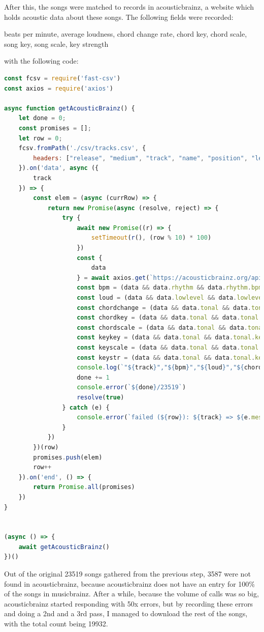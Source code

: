 \documentclass[10pt, a4paper]{article}
\begin{document}
After this, the songs were matched to records in acousticbrainz, a website which holds acoustic data about these songs. The following fields were recorded:

beats per minute, average loudness, chord change rate, chord key, chord scale, song key, song scale, key strength

with the following code:

\begin{lstlisting}[language=JavaScript, label=lst:acousticbrainzMatch, caption = Matching individual tracks in musicbrainz with entries in acousticbrainz ]
const fcsv = require('fast-csv')
const axios = require('axios')

async function getAcousticBrainz() {
	let done = 0;
	const promises = [];
	let row = 0;
	fcsv.fromPath('./csv/tracks.csv', {
		headers: ["release", "medium", "track", "name", "position", "length"]
	}).on('data', async ({
		track
	}) => {
		const elem = (async (currRow) => {
			return new Promise(async (resolve, reject) => {
				try {
					await new Promise((r) => {
						setTimeout(r(), (row % 10) * 100)
					})
					const {
						data
					} = await axios.get(`https://acousticbrainz.org/api/v1/${track}/low-level`)
					const bpm = (data && data.rhythm && data.rhythm.bpm) || "0"
					const loud = (data && data.lowlevel && data.lowlevel.average_loudness) || "0"
					const chordchange = (data && data.tonal && data.tonal.chords_changes_rate) || "0"
					const chordkey = (data && data.tonal && data.tonal.chords_key) || ""
					const chordscale = (data && data.tonal && data.tonal.chords_scale) || ""
					const keykey = (data && data.tonal && data.tonal.key_key) || ""
					const keyscale = (data && data.tonal && data.tonal.key_scale) || ""
					const keystr = (data && data.tonal && data.tonal.key_strength) || "0"
					console.log(`"${track}","${bpm}","${loud}","${chordkey} ${chordscale}","${chordchange}","${keykey} ${keyscale}","${keystr}"`)
					done += 1
					console.error(`${done}/23519`)
					resolve(true)
				} catch (e) {
					console.error(`failed (${row}): ${track} => ${e.message}`)
				}
			})
		})(row)
		promises.push(elem)
		row++
	}).on('end', () => {
		return Promise.all(promises)
	})
}


(async () => {
	await getAcousticBrainz()
})()
\end{lstlisting}

Out of the original 23519 songs gathered from the previous step, 3587 were not found in acousticbrainz, because acousticbrainz does not have an entry for 100\% of the songs in musicbrainz.
After a while, because the volume of calls was so big, acousticbrainz started responding with 50x errors, but by recording these errors and doing a 2nd and a 3rd pass, I managed to download the rest of the songs, with the total count being 19932.
\end{document}
